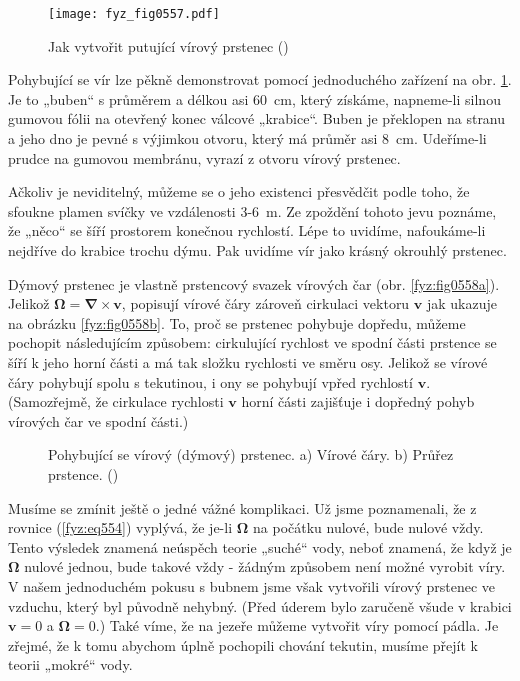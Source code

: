     \begin{figure}[ht!] %
      \centering
      \texttt{[image: fyz\_fig0557.pdf]}
      \caption{Jak vytvořit putující vírový prstenec
               (\cite[s.~755]{Feynman02})}
      \label{fyz:fig0557}
    \end{figure}
    
    Pohybující se vír lze pěkně demonstrovat pomocí jednoduchého zařízení na obr. \ref{fyz:fig0557}. 
    Je to „buben“ s průměrem a délkou asi \SI{60}{cm}, který získáme, napneme-li silnou gumovou 
    fólii na otevřený konec válcové „krabice“. Buben je překlopen na stranu a jeho dno je pevné s 
    výjimkou otvoru, který má průměr asi \SI{8}{cm}. Udeříme-li prudce na gumovou membránu, vyrazí 
    z otvoru vírový prstenec.
    
    Ačkoliv je neviditelný, můžeme se o jeho existenci přesvědčit podle toho, že sfoukne plamen 
    svíčky ve vzdálenosti \num{3}-\SI{6}{m}. Ze zpoždění tohoto jevu poznáme, že „něco“ se šíří 
    prostorem konečnou rychlostí. Lépe to uvidíme, nafoukáme-li nejdříve do krabice trochu dýmu. 
    Pak uvidíme vír jako krásný okrouhlý prstenec.
    
    Dýmový prstenec je vlastně prstencový svazek vírových čar (obr. \ref{fyz:fig0558a}). Jelikož 
    \(\symbf{\Omega} = \symbf{\nabla}\times\bm{v}\), popisují vírové čáry zároveň cirkulaci vektoru 
    \(\bm{v}\) jak ukazuje na obrázku \ref{fyz:fig0558b}. To, proč se prstenec pohybuje dopředu, 
    můžeme pochopit následujícím způsobem: cirkulující rychlost ve spodní části prstence se šíří k 
    jeho horní části a má tak složku rychlosti ve směru osy. Jelikož se vírové čáry pohybují spolu 
    s tekutinou, i ony se pohybují vpřed rychlostí \(\bm{v}\). (Samozřejmě, že cirkulace rychlosti 
    \(\bm{v}\) horní části zajišťuje i dopředný pohyb vírových čar ve spodní části.)
    
    \begin{figure}[ht!]
      \centering
      \caption{Pohybující se vírový (dýmový) prstenec. a) Vírové čáry. b) Průřez prstence.
               (\cite[s.~756]{Feynman02})}
    \end{figure}
    
    Musíme se zmínit ještě o jedné vážné komplikaci. Už jsme poznamenali, že z rovnice 
    (\ref{fyz:eq554}) vyplývá, že je-li \(\symbf{\Omega}\) na počátku nulové, bude nulové vždy. 
    Tento výsledek znamená neúspěch teorie „suché“ vody, neboť znamená, že když je 
    \(\symbf{\Omega}\) nulové jednou, bude takové vždy - žádným způsobem není možné vyrobit víry. V 
    našem jednoduchém pokusu s bubnem jsme však vytvořili vírový prstenec ve vzduchu, který byl 
    původně nehybný. (Před úderem bylo zaručeně všude v krabici \(\bm{v} = 0\) a 
    \(\symbf{\Omega}=0\).) Také víme, že na jezeře můžeme vytvořit víry pomocí pádla. Je zřejmé, že 
    k tomu abychom úplně pochopili chování tekutin, musíme přejít k teorii „mokré“ vody.
    
